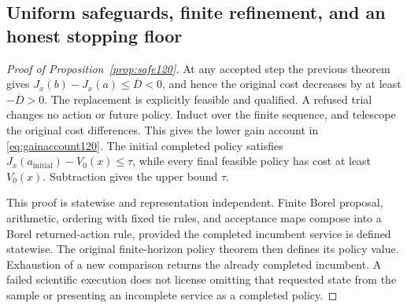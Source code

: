 \subsection{Uniform safeguards, finite refinement, and an honest stopping floor}
\begin{proof}[Proof of Proposition~\ref{prop:safe120}]
At any accepted step the previous theorem gives
$J_x(b)-J_x(a)\le\overline D<0$, and hence the original
cost decreases by at least $-\overline D>0$.
The replacement is explicitly feasible and qualified.
A refused trial changes no action or future policy.
Induct over the finite sequence, and telescope the original
cost differences.  This gives the lower gain account in
\eqref{eq:gainaccount120}.  The initial completed policy satisfies
$J_x(a_{\mathrm{initial}})-V_0(x)\le\tau$, while every final
feasible policy has cost at least $V_0(x)$.  Subtraction gives
the upper bound $\tau$.

This proof is statewise and representation independent.
Finite Borel proposal, arithmetic, ordering with fixed tie rules,
and acceptance maps compose into a Borel returned-action rule,
provided the completed incumbent service is defined statewise.
The original finite-horizon policy theorem then defines its
policy value.  Exhaustion of a new comparison returns the
already completed incumbent.  A failed scientific execution
does not license omitting that requested state from the sample
or presenting an incomplete service as a completed policy.
\end{proof}

